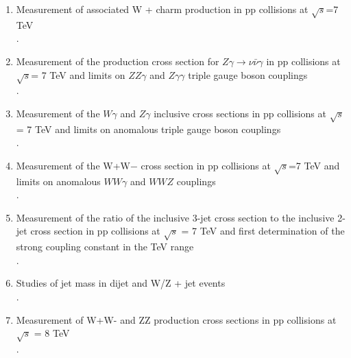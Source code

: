 \documentclass [12pt]{report}
\begin{document}
\begin{enumerate}
\item Measurement of associated W + charm production in pp collisions at $\sqrt{s}$=7 TeV\\
.

\item Measurement of the production cross section for $Z\gamma \rightarrow \nu\bar{\nu}\gamma$ in pp collisions at $\sqrt{s}$= 7 TeV and limits on $ZZ\gamma$ and $Z\gamma\gamma$ triple gauge boson couplings \\
.

\item Measurement of the $W\gamma$ and $Z\gamma$ inclusive cross sections in pp collisions at $\sqrt{s}$ = 7 TeV and limits on anomalous triple gauge boson couplings\\
.

\item Measurement of the W+W− cross section in pp collisions at $\sqrt{s}$=7 TeV and limits on anomalous $WW\gamma$ and $WWZ$ couplings\\
.

\item Measurement of the ratio of the inclusive 3-jet cross section to the inclusive 2-jet cross section in pp collisions at $\sqrt{s}$ = 7 TeV and first determination of the strong coupling constant in the TeV range\\
.

\item Studies of jet mass in dijet and W/Z + jet events\\
.

\item Measurement of W+W- and ZZ production cross sections in pp collisions at $\sqrt{s}$ = 8 TeV\\
.


\end{enumerate}
\end{document}
